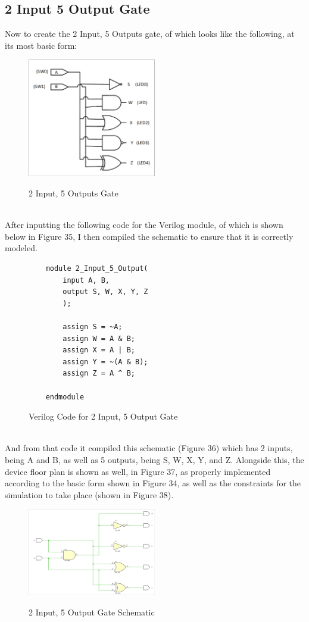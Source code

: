 \documentclass{article}
\begin{document}
\subsection{2 Input 5 Output Gate}
Now to create the 2 Input, 5 Outputs gate, of which looks like the following, at its most basic form:\\
\begin{figure}[!!htbpbp]
    \centering
    \caption{2 Input, 5 Outputs Gate}
    \includegraphics[width=0.5\textwidth]{2input-GATE.png}
    \label{2 Input 5 Output Gate, Simple}
\end{figure}\\
After inputting the following code for the Verilog module, of which is shown below in Figure 35, I then compiled the schematic to ensure that it is correctly modeled.\\
\begin{figure}[!!htbpbp]
    \centering
    \caption{Verilog Code for 2 Input, 5 Output Gate}
    \begin{verbatim}
    module 2_Input_5_Output(
        input A, B,
        output S, W, X, Y, Z
        );
        
        assign S = ~A;
        assign W = A & B;
        assign X = A | B;
        assign Y = ~(A & B);
        assign Z = A ^ B;
        
    endmodule
    \end{verbatim}
\end{figure}\\
And from that code it compiled this schematic (Figure 36) which has 2 inputs, being A and B, as well as 5 outputs, being S, W, X, Y, and Z. Alongside this, the device floor plan is shown as well, in Figure 37, as properly implemented according to the basic form shown in Figure 34, as well as the constraints for the simulation to take place (shown in Figure 38).\\
\begin{figure}[!!htbpbp]
    \centering
    \caption{2 Input, 5 Output Gate Schematic}
    \includegraphics[width=0.5\textwidth]{2input-GATE-SCHEMATIC.png}
    \label{2 Input 5 Output, Schematic}
\end{figure}\\
\end{document}
